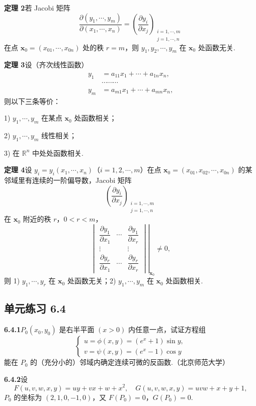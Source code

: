 \documentclass[UTF8,12pt,a4paper,fontset=fandol]{ctexart}
\begin{document}
\noindent\textbf{定理 2}\quad 若 Jacobi 矩阵
\[
  \frac{\partial(y_1,\cdots,y_m)}{\partial(x_1,\cdots,x_n)}
  =
  \left(\frac{\partial y_i}{\partial x_j}\right)_
  {\substack{i=1,\cdots,m\\ j=1,\cdots,n}}
\]
在点 $\mathbf x_0=(x_{01},\cdots,x_{0n})$ 处的秩 $r=m$，则
$y_1,y_2,\cdots,y_m$ 在 $\mathbf x_0$ 处函数无关.

\noindent\textbf{定理 3}\quad 设（齐次线性函数）
\[
\begin{aligned}
  y_1&=a_{11}x_1+\cdots+a_{1n}x_n,\\
  &\cdots\cdots\cdots\\
  y_m&=a_{m1}x_1+\cdots+a_{mn}x_n,
\end{aligned}
\]
则以下三条等价：

1) $y_1,\cdots,y_m$ 在某点 $\mathbf x_0$ 处函数相关；

2) $y_1,\cdots,y_m$ 线性相关；

3) 在 $\mathbb R^n$ 中处处函数相关.

\noindent\textbf{定理 4}\quad 设 $y_i=y_i(x_1,\cdots,x_n)$（$i=1,2,\cdots,m$）在点
$\mathbf x_0=(x_{01},x_{02},\cdots,x_{0n})$ 的某邻域里有连续的一阶偏导数，Jacobi 矩阵
\[
  \left(\frac{\partial y_i}{\partial x_j}\right)_
  {\substack{i=1,\cdots,m\\ j=1,\cdots,n}}
\]
在 $\mathbf x_0$ 附近的秩 $r$，$0<r<m$，
\[
\left.
\begin{vmatrix}
  \dfrac{\partial y_1}{\partial x_1} & \cdots & \dfrac{\partial y_1}{\partial x_r}\\
  \vdots & & \vdots\\
  \dfrac{\partial y_r}{\partial x_1} & \cdots & \dfrac{\partial y_r}{\partial x_r}
\end{vmatrix}
\right|_{\mathbf x_0}
\ne0,
\]
则 1) $y_1,\cdots,y_r$ 在 $\mathbf x_0$ 处函数无关；2) $y_1,\cdots,y_m$ 在 $\mathbf x_0$ 处函数相关.

\subsection*{单元练习 6.4}

\noindent\textbf{6.4.1}\quad $P_0(x_0,y_0)$ 是右半平面 $(x>0)$ 内任意一点，试证方程组
\[
\begin{cases}
  u=\phi(x,y)=(e^x+1)\sin y,\\
  v=\psi(x,y)=(e^x-1)\cos y
\end{cases}
\]
能在 $P_0$ 的（充分小的）邻域内确定连续可微的反函数.（北京师范大学）

\noindent\textbf{6.4.2}\quad 设
\[
  F(u,v,w,x,y)=uy+vx+w+x^2,\quad
  G(u,v,w,x,y)=uvw+x+y+1,
\]
$P_0$ 的坐标为 $(2,1,0,-1,0)$，又 $F(P_0)=0$，$G(P_0)=0$.
\end{document}

